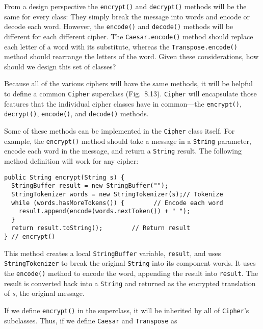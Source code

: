 From a design perspective the {\tt encrypt()} and {\tt decrypt()}
methods will be the same for every class: They simply break the
message into words and encode or decode each word.  However, the
{\tt encode()} and {\tt decode()} methods will be different for each
different cipher.  The {\tt Caesar.encode()} method should replace each
letter of a word with its substitute, whereas the
{\tt Transpose.encode()} method should rearrange the letters of the
word.  Given these considerations, how should we design this set of
classes?

Because all of the various ciphers will have the same methods, it will
be helpful to define a common {\tt Cipher} superclass
(Fig.~8.13).  {\tt Cipher} will encapsulate those
features that the individual cipher classes have in common---the
{\tt encrypt()}, {\tt decrypt()}, {\tt encode()}, and {\tt decode()}
methods.

Some of these methods can be implemented in the {\tt Cipher} class
itself.  For example, the {\tt encrypt()} method should take a message
in a {\tt String} parameter, encode each word in the message, and
return a {\tt String} result.  The following method definition will
work for any cipher:

\begin{jjjlisting}[26.5pc]
\begin{lstlisting}
public String encrypt(String s) {
  StringBuffer result = new StringBuffer("");          
  StringTokenizer words = new StringTokenizer(s);// Tokenize
  while (words.hasMoreTokens()) {        // Encode each word 
    result.append(encode(words.nextToken()) + " "); 
  }
  return result.toString();        // Return result
} // encrypt()
\end{lstlisting}
\end{jjjlisting}

\noindent This method creates a local {\tt StringBuffer} variable,
{\tt result}, and uses {\tt StringTokenizer} to break the original
{\tt String} into its component words.  It uses the {\tt encode()} method to
encode the word, appending the result into {\tt result}. The result is
converted back into a {\tt String} and returned as the encrypted
translation of {\it s}, the original message.

If we define {\tt encrypt()} in the superclass, it will be inherited
by all of {\tt Cipher}'s subclasses.  Thus, if we define {\tt Caesar}
and {\tt Transpose} as


